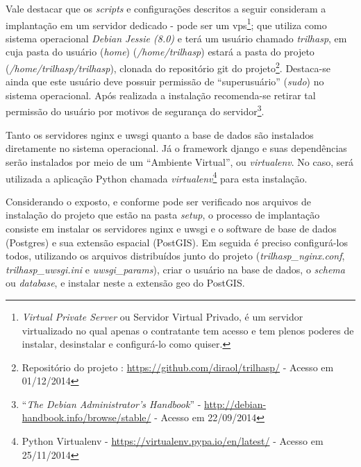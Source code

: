 Vale destacar que os \textit{scripts} e configurações descritos a seguir consideram a implantação em um servidor dedicado - pode ser um \gls{vps}\footnote{\textit{Virtual Private Server} ou Servidor Virtual Privado, é um servidor virtualizado no qual apenas o contratante tem acesso e tem plenos poderes de instalar, desinstalar e configurá-lo como quiser.}; que utiliza como sistema operacional \textit{Debian Jessie (8.0)} e terá um usuário chamado \textit{trilhasp}, em cuja pasta do usuário (\textit{home}) (\textit{/home/trilhasp}) estará a pasta do projeto (\textit{/home/trilhasp/trilhasp}), clonada do repositório git do projeto\footnote{Repositório do projeto \trilhasp: \url{https://github.com/diraol/trilhasp/} - Acesso em 01/12/2014}. Destaca-se ainda que este usuário deve possuir permissão de ``superusuário'' (\textit{sudo}) no sistema operacional. Após realizada a instalação recomenda-se retirar tal permissão do usuário por motivos de segurança do servidor\footnote{``\textit{The Debian Administrator's Handbook}'' - \url{http://debian-handbook.info/browse/stable/} - Acesso em 22/09/2014}.

Tanto os servidores \gls{nginx} e \gls{uwsgi} quanto a base de dados são instalados diretamente no sistema operacional. Já o framework \gls{django} e suas dependências serão instalados por meio de um ``Ambiente Virtual'', ou \textit{virtualenv}. No caso, será utilizada a aplicação Python chamada \textit{virtualenv}\footnote{Python Virtualenv - \url{https://virtualenv.pypa.io/en/latest/} - Acesso em 25/11/2014} para esta instalação.

\clearpage
{}

Considerando o exposto, e conforme pode ser verificado nos arquivos de instalação do projeto que estão na pasta \textit{setup}, o processo de implantação consiste em instalar os servidores \gls{nginx} e \gls{uwsgi} e o software de base de dados (Postgres) e sua extensão espacial (PostGIS). Em seguida é preciso configurá-los todos, utilizando os arquivos distribuídos junto do projeto (\textit{trilhasp\_nginx.conf}, \textit{trilhasp\_uwsgi.ini} e \textit{uwsgi\_params}), criar o usuário na base de dados, o \textit{schema} ou \textit{database}, e instalar neste a extensão geo do PostGIS.

